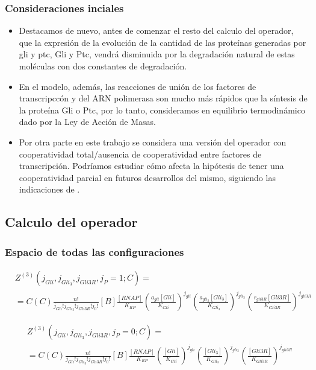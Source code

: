 \subsubsection{Consideraciones inciales}
\begin{itemize}

\item Destacamos de nuevo, antes de comenzar el resto del calculo del operador, que la expresión de la evolución de la cantidad de las proteínas generadas por gli y ptc, Gli y Ptc, vendrá disminuida por la degradación natural de estas moléculas con dos constantes de degradación.

\item En el modelo, además, las reacciones de unión de los factores de transcripccón y del ARN polimerasa son mucho más rápidos que la síntesis de la proteína Gli o Ptc, por lo tanto, consideramos en equilibrio termodinámico dado por la Ley de Acción de Masas.

\item Por otra parte en este trabajo se considera una versión del operador con cooperatividad total/ausencia de cooperatividad entre factores de transcripción. Podríamos estudiar cómo afecta la hipótesis de tener una cooperatividad parcial en futuros desarrollos del mismo, siguiendo las indicaciones de \cite{cambon1}.
	 
\end{itemize}
\subsection{Calculo del operador}
\subsubsection{Espacio de todas las configuraciones}

\begin{equation}
\begin{split}
&Z^{(3)}(j_{Gli}, j_{Gli_3}, j_{Gli3R},j_P=1;C)=\\&=\textit{C}(C)\frac{n!}{j_{Gli}! j_{Gli_3}! j_{Gli3R}!j_0!}[B]\frac{[RNAP]}{K_{RP}}
(\frac{a_{gli}[Gli]}{K_{Gli}})^{j_{gli}}
(\frac{a_{gli_3}[Gli_3]}{K_{Gli_3}})^{j_{gli_3}}
(\frac{r_{gli3R}[Gli3R]}{K_{Gli3R}})^{j_{gli3R}}
\end{split}
\end{equation}

\begin{equation}
\begin{split}
&Z^{(3)}(j_{Gli}, j_{Gli_3}, j_{Gli3R},j_P=0;C)=\\&=\textit{C}(C)\frac{n!}{j_{Gli}! j_{Gli_3}! j_{Gli3R}!j_0!}[B]\frac{[RNAP]}{K_{RP}}
(\frac{[Gli]}{K_{Gli}})^{j_{gli}}
(\frac{[Gli_3]}{K_{Gli_3}})^{j_{gli_3}}
(\frac{[Gli3R]}{K_{Gli3R}})^{j_{gli3R}}
\end{split}
\end{equation}


